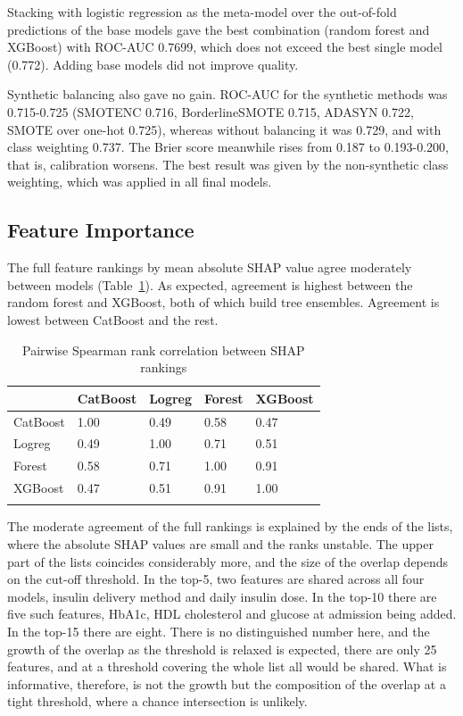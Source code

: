 \documentclass[pdflatex,sn-basic,Numbered]{sn-jnl}
\begin{document}
Stacking with logistic regression as the meta-model over the out-of-fold predictions of the base models gave the best combination (random forest and XGBoost) with ROC-AUC 0.7699, which does not exceed the best single model (0.772). Adding base models did not improve quality.

Synthetic balancing also gave no gain. ROC-AUC for the synthetic methods was 0.715-0.725 (SMOTENC 0.716, BorderlineSMOTE 0.715, ADASYN 0.722, SMOTE over one-hot 0.725), whereas without balancing it was 0.729, and with class weighting 0.737. The Brier score meanwhile rises from 0.187 to 0.193-0.200, that is, calibration worsens. The best result was given by the non-synthetic class weighting, which was applied in all final models.

\subsection{Feature Importance}\label{subsec3_7}

The full feature rankings by mean absolute SHAP value agree moderately between models (Table~\ref{tab6}). As expected, agreement is highest between the random forest and XGBoost, both of which build tree ensembles. Agreement is lowest between CatBoost and the rest.

\begin{table}[h]
\caption{Pairwise Spearman rank correlation between SHAP rankings}\label{tab6}%
\begin{tabular}{@{}lllll@{}}
\toprule
 & CatBoost & Logreg & Forest & XGBoost\\
\midrule
CatBoost & 1.00 & 0.49 & 0.58 & 0.47\\
Logreg & 0.49 & 1.00 & 0.71 & 0.51\\
Forest & 0.58 & 0.71 & 1.00 & 0.91\\
XGBoost & 0.47 & 0.51 & 0.91 & 1.00\\
\botrule
\end{tabular}
\end{table}

The moderate agreement of the full rankings is explained by the ends of the lists, where the absolute SHAP values are small and the ranks unstable. The upper part of the lists coincides considerably more, and the size of the overlap depends on the cut-off threshold. In the top-5, two features are shared across all four models, insulin delivery method and daily insulin dose. In the top-10 there are five such features, HbA1c, HDL cholesterol and glucose at admission being added. In the top-15 there are eight. There is no distinguished number here, and the growth of the overlap as the threshold is relaxed is expected, there are only 25 features, and at a threshold covering the whole list all would be shared. What is informative, therefore, is not the growth but the composition of the overlap at a tight threshold, where a chance intersection is unlikely.
\end{document}

